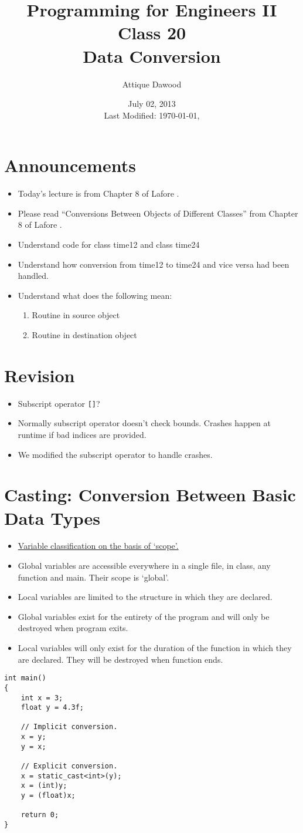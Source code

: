 \documentclass[12pt,a4paper]{article}
\title{\vspace{-2cm}Programming for Engineers II\\Class 20\\Data Conversion}
\author{Attique Dawood}
\date{July 02, 2013\\[0.2cm] Last Modified: \today, \currenttime}
\begin{document}
\maketitle
\section{Announcements}
\begin{itemize}
\item Today's lecture is from Chapter 8 of Lafore \cite{Lafore}.
\item Please read ``Conversions Between Objects of Different Classes'' from Chapter 8 of Lafore \cite{Lafore}.
\item Understand code for class time12 and class time24
\item Understand how conversion from time12 to time24 and vice versa had been handled.
\item Understand what does the following mean:
\begin{enumerate}
\item Routine in source object
\item Routine in destination object
\end{enumerate}
\end{itemize}
\section{Revision}
\begin{itemize}
\item Subscript operator \verb|[]|?
\item Normally subscript operator doesn't check bounds. Crashes happen at runtime if bad indices are provided.
\item We modified the subscript operator to handle crashes.
\end{itemize}
\section{Casting: Conversion Between Basic Data Types}
\begin{itemize}
\item \underline{Variable classification on the basis of `scope'.}
\item Global variables are accessible everywhere in a single file, in class, any function and main. Their scope is `global'.
\item Local variables are limited to the structure in which they are declared.
\item Global variables exist for the entirety of the program and will only be destroyed when program exits.
\item Local variables will only exist for the duration of the function in which they are declared. They will be destroyed when function ends.
\end{itemize}
\begin{lstlisting}[caption={Variable Casting}]
int main()
{
	int x = 3;
	float y = 4.3f;

	// Implicit conversion.
	x = y;
	y = x;

	// Explicit conversion.
	x = static_cast<int>(y);
	x = (int)y;
	y = (float)x;
	
	return 0;
}
\end{lstlisting}
\end{document}

